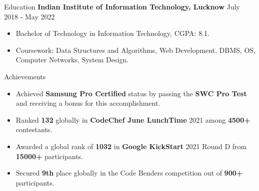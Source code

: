 \documentclass{resume}
\begin{document}
\begin{rSection}{Education}
    {\bf Indian Institute of Information Technology, Lucknow} \hfill {July 2018 - May 2022} \\
    \vspace{-1pt}
    \begin{itemize}
        \itemsep -3pt {}
        \item Bachelor of Technology in Information Technology, CGPA: 8.1.
        \item Coursework: Data Structures and Algorithms, Web Development, DBMS, OS, Computer Networks, System Design.
    \end{itemize}
\end{rSection}

\vspace{-5pt}
\begin{rSection}{Achievements}
    \begin{itemize}
        \itemsep 1pt {}
        \vspace{3pt}
            \item Achieved \textbf{Samsung Pro Certified} status by passing the \textbf{SWC Pro Test} and receiving a bonus for this accomplishment.
            \item Ranked \textbf{132} globally in \textbf{CodeChef June LunchTime} 2021 among \textbf{4500+} contestants.
            \vspace{-3pt}
            \item Awarded a global rank of \textbf{1032} in \textbf{Google KickStart} 2021 Round D from \textbf{15000+} participants.
            \vspace{-3pt}
            \item Secured \textbf{9th} place globally in the Code Benders competition out of \textbf{900+} participants.
        \vspace{-3pt}
    \end{itemize}
\end{rSection}
\end{document}
